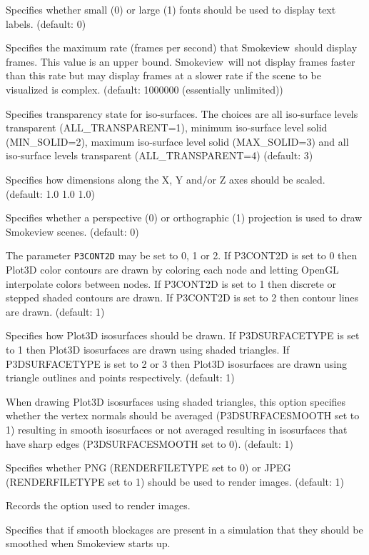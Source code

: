 \documentclass[11pt,twoside]{book}
\newcommand{\Smokeview}{{Smokeview}}
\newcommand{\smokeview}{{Smokeview}}
\newcommand{\hitem}[1]{\item[{\bf #1} \hfill]}
\begin{document}
\hitem{FONTSIZE} Specifies whether small (0) or large (1)
fonts should be used to display text labels. (default: 0)

\hitem{FRAMERATEVALUE}Specifies the maximum rate (frames per second)
that \smokeview\ should display frames.
This value is an upper bound.  \Smokeview\ will not display frames faster than
this rate but may display frames at a slower rate if the scene to be visualized is
complex.
(default: 1000000 (essentially unlimited))

\hitem{ISOTRANS}Specifies transparency state for iso-surfaces. The choices
are all iso-surface levels transparent (ALL\_TRANSPARENT=1), minimum
iso-surface level solid (MIN\_SOLID=2), maximum iso-surface level solid (MAX\_SOLID=3)
and all iso-surface levels transparent (ALL\_TRANSPARENT=4) (default: 3)

\hitem{MSCALE} Specifies how dimensions along the X, Y
and/or Z axes should be scaled. (default: 1.0 1.0 1.0)

\hitem{PROJECTION} Specifies whether a perspective (0) or orthographic (1) projection
is used to draw Smokeview scenes.
(default: 0)

\hitem{P3CONT2D}The parameter {\tt P3CONT2D} may be set to 0, 1 or
2.  If P3CONT2D is set to 0 then Plot3D color contours are drawn
by coloring each node and letting OpenGL interpolate colors
between nodes.  If P3CONT2D is set to 1 then discrete or stepped
shaded contours are drawn.  If P3CONT2D is set to 2 then contour
lines are drawn. (default: 1)

\hitem{P3DSURFACETYPE}Specifies how Plot3D isosurfaces should be
drawn.  If P3DSURFACETYPE is set to 1 then Plot3D isosurfaces are
drawn using shaded triangles.  If P3DSURFACETYPE is set to 2 or 3
then Plot3D isosurfaces are drawn using triangle outlines and
points respectively. (default: 1)

\hitem{P3DSURFACESMOOTH}When drawing Plot3D isosurfaces using
shaded triangles, this option specifies whether the vertex normals
should be averaged (P3DSURFACESMOOTH set to 1) resulting in smooth
isosurfaces or not averaged resulting in isosurfaces that have
sharp edges (P3DSURFACESMOOTH set to 0). (default: 1)

\hitem{RENDERFILETYPE}Specifies whether PNG (RENDERFILETYPE set to 0) or JPEG (RENDERFILETYPE set to 1)
should be used to render images.  (default: 1)

\hitem{RENDEROPTION} Records the option used to render images.

\hitem{SBATSTART} Specifies that if smooth blockages are present in a simulation that they should be
smoothed when Smokeview starts up.
\end{document}
